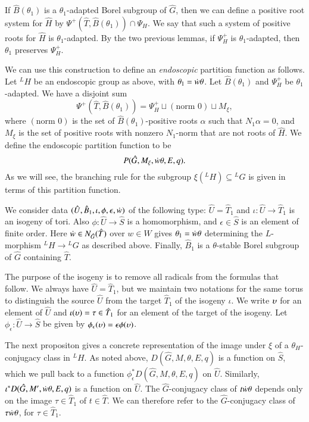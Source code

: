 If $\hat B(\theta_1)$ is a $\theta_1$-adapted Borel subgroup of $\hat G$,
then we can define a positive root system for $\hat H$ by
$\Psi^+(\hat T,\hat B(\theta_1))\cap \Psi_H$.  We say that such a system of positive
roots for $\hat H$ is $\theta_1$-adapted.  By the two previous lemmas,
if $\Psi^+_H$ is $\theta_1$-adapted, then $\theta_1$ preserves $\Psi^+_H$.

We can use this construction to define an {\it endoscopic} partition function as follows.
Let ${}^LH$ be an endoscopic group
as above, with $\theta_1 = \dot w \theta$.
Let $\hat B(\theta_1)$ and $\Psi^+_H$ be $\theta_1$-adapted.  
We have a disjoint sum
\begin{equation}\label{eqn:disj-b1}
\Psi^+(\hat T,\hat B(\theta_1)) = \Psi^+_H \sqcup (\text{norm }  0) \sqcup M_\xi,
\end{equation}
where $(\text{norm } 0)$ is the set of $\hat B(\theta_1)$-positive roots $\alpha$ such that $N_1\alpha=0$,
and $M_\xi$ is the set of positive roots with nonzero $N_1$-norm that are not roots
of $\hat H$.
We define the endoscopic partition function to be
\begin{equation}\label{eqn:endo-partition}
P(\hat G,M_\xi,\dot w\theta,E,q).
\end{equation}
As we will see, the branching rule for the subgroup $\xi({}^LH)\subseteq {}^LG$ is
given in terms of this partition function.

We consider data $(\hat U,\hat B_1,\iota,\phi,\epsilon,\dot w)$ of the
following type: $\hat U = \hat T_1$ and $\iota:\hat U\to \hat T_1$ is
an isogeny of tori.  Also $\phi:\hat U\to \hat S$ is a homomorphism,
and $\epsilon\in \hat S$ is an element of finite order.  Here
$\dot w\in N_{\hat G}(\hat T)$ over $w\in W$ gives
$\theta_1=\dot w\theta$ determining the $L$-morphism ${}^LH\to {}^LG$
as described above.  Finally, $\hat B_1$ is a $\theta$-stable Borel
subgroup of $\hat G$ containing $\hat T$.

The purpose of the isogeny is to remove all radicals from the formulas that follow.
We always have $\hat U = \hat T_1$, but we maintain two notations for
the same torus to distinguish the source $\hat U$ from the target
$\hat T_1$ of the isogeny $\iota$.  We write $\upsilon$ for an element of
$\hat U$ and $\iota(\upsilon)=\tau\in \hat T_1$ for an element of the target of the
isogeny.  Let $\phi_\epsilon:\hat U\to\hat S$ be given by $\phi_\epsilon(\upsilon)=
\epsilon\phi(\upsilon)$.

The next propositon gives a concrete representation of the image under
$\xi$ of a $\theta_H$-conjugacy class in ${}^LH$.  As noted above,
$D(\hat G,M,\theta,E,q)$ is a function on $\hat S$, which we pull back
to a function $\phi^*_\epsilon D(\hat G,M,\theta,E,q)$ on $\hat U$.
Similarly, $\iota^* D(\hat G,M',\dot w \theta,E,q)$ is a function on
$\hat U$.  The $\hat G$-conjugacy class of $t\dot w \theta$ depends
only on the image $\tau\in \hat T_1$ of $t\in \hat T$.  We can
therefore refer to the $\hat G$-conjugacy class of $\tau\dot w\theta$,
for $\tau\in \hat T_1$.

